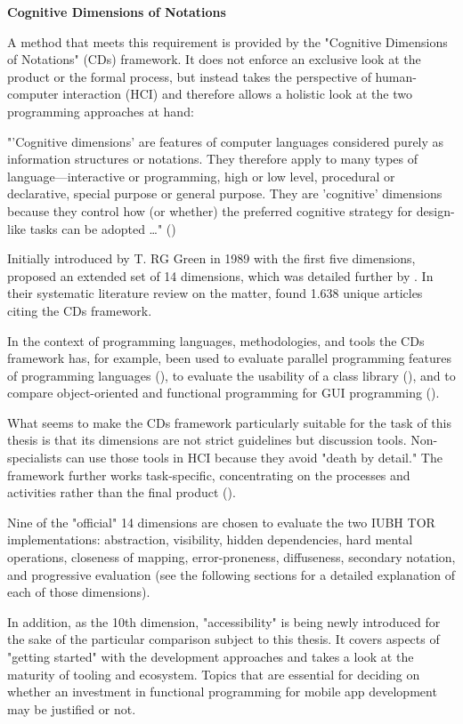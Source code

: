 \textbf{Cognitive Dimensions of Notations}

A method that meets this requirement is provided by the "Cognitive Dimensions of Notations" (CDs) framework. It does not enforce an exclusive look at the product or the formal process, but instead takes the perspective of human-computer interaction (HCI) and therefore allows a holistic look at the two programming approaches at hand:

"'Cognitive dimensions' are features of computer languages considered purely as information structures or notations. They therefore apply to many types of language—interactive or programming, high or low level, procedural or declarative, special purpose or general purpose. They are 'cognitive' dimensions because they control how (or whether) the preferred cognitive strategy for design-like tasks can be adopted \dots" (\cite{green_cognitive_1989})

Initially introduced by T. RG Green in 1989 with the first five dimensions, \cite{green_usability_1996} proposed an extended set of 14 dimensions, which was detailed further by \cite{blackwell_notational_2003}. In their systematic literature review on the matter, \cite{hadhrawi_systematic_2017} found 1.638 unique articles citing the CDs framework. 

In the context of programming languages, methodologies, and tools the CDs framework has, for example, been used to evaluate parallel programming features of programming languages (\cite{sadowski_heuristic_2011}), to evaluate the usability of a class library (\cite{clarke_using_2003}), and to compare object-oriented and functional programming for GUI programming (\cite{kiss_comparison_2014}).

What seems to make the CDs framework particularly suitable for the task of this thesis is that its dimensions are not strict guidelines but discussion tools. Non-specialists can use those tools in HCI because they avoid "death by detail." The framework further works task-specific, concentrating on the processes and activities rather than the final product (\cite{blackwell_notational_2003}).

Nine of the "official" 14 dimensions are chosen to evaluate the two IUBH TOR implementations: abstraction, visibility, hidden dependencies, hard mental operations, closeness of mapping, error-proneness, diffuseness, secondary notation, and progressive evaluation (see the following sections for a detailed explanation of each of those dimensions). 

In addition, as the 10th dimension, "accessibility" is being newly introduced for the sake of the particular comparison subject to this thesis. It covers aspects of "getting started" with the development approaches and takes a look at the maturity of tooling and ecosystem. Topics that are essential for deciding on whether an investment in functional programming for mobile app development may be justified or not.